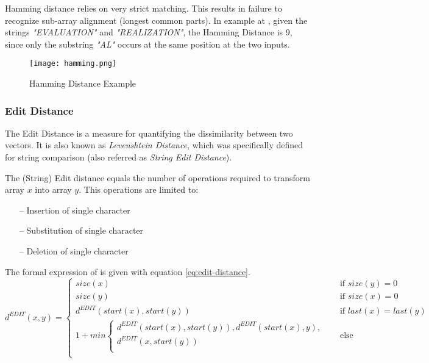 Hamming distance relies on very strict matching. This results in failure to recognize sub-array alignment (longest common parts). 
In example at , given the strings \emph{"EVALUATION"} and \emph{"REALIZATION"}, 
the Hamming Distance is 9, 
since only the substring \emph{"AL"} occurs at the same position at the two inputs.

\begin{figure}[ht]
	\centering
	\texttt{[image: hamming.png]}
	\caption{Hamming Distance Example} 
	\label{fig:hamming}
\end{figure}

\subsubsection{Edit Distance}
The Edit Distance  is a measure for quantifying the dissimilarity between two vectors\cite{Jurafsky:2009:SLP:1214993}.
It is also known as \emph{Levenshtein Distance}, which was specifically defined for string comparison 
(also referred as \emph{String Edit Distance})\cite{Navarro:2001:GTA:375360.375365}.

The (String) Edit distance equals the number of operations required to transform array $x$ into array $y$. 
This operations are limited to:
\begin{itemize}
	\item[--] Insertion of single character
	\item[--] Substitution of single character
	\item[--] Deletion of single character
\end{itemize}

The formal expression of is given with equation \ref{eq:edit-distance}.
\begin{equation}
	d^{EDIT}(x,y) = 	
	\begin{cases}
	size(x)	  & \quad \text{if } size(y)=0 \\
	size(y)	  & \quad \text{if } size(x)=0 \\
	d^{EDIT}(start(x),start(y))	  & \quad \text{if } last(x)=last(y) \\
	1 + min\begin{cases}
		d^{EDIT}(start(x),start(y)),
		d^{EDIT}(start(x),y), \\
		d^{EDIT}(x,start(y)) \\
		\end{cases} & \quad \text{else }\\
	\end{cases} 
	\label{eq:edit-distance}
\end{equation}

